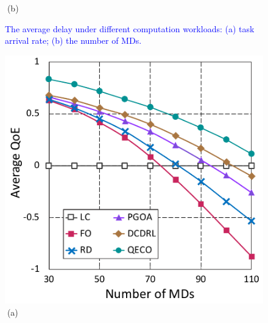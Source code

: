 \documentclass[12pt,draftclsnofoot,onecolumn]{IEEEtran}
\begin{document}
\begin{enumerate}
\begin{figure}[H]
\begin{minipage}[b]{0.3\linewidth}
		\textcolor{white}{i}\hspace{0.6cm}(b)
	\end{minipage}

	\caption{\textcolor{blue}{The average delay under different computation workloads: (a) task arrival rate; (b) the number of MDs.}}
	\label{chart3}
\end{figure} \vspace{-8mm}
\begin{figure}[H]\centering
	\captionsetup{name=Fig.}
	\begin{minipage}[b]{0.3\linewidth}
		\centering
		\includegraphics[width=\textwidth]{ qoe_2} 		
		\textcolor{white}{i}\hspace{0.6cm}(a)
	\end{minipage}
	\hspace{-0.2cm}
	\begin{minipage}[b]{0.3\linewidth}
		\centering

\end{minipage}
\end{figure}
\end{enumerate}
\end{document}
